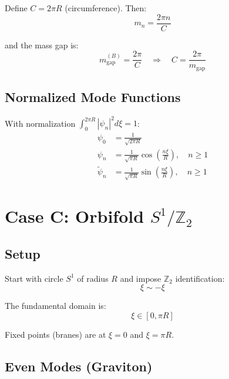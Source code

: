 \documentclass[11pt,a4paper]{article}
\newcommand{\mgap}{m_{\mathrm{gap}}}
\begin{document}
Define $C = 2\pi R$ (circumference). Then:
\begin{equation}
m_n = \frac{2\pi n}{C}
\label{eq:spectrum-B-circ}
\end{equation}

and the mass gap is:
\begin{equation}
\mgap^{(B)} = \frac{2\pi}{C} \quad \Rightarrow \quad C = \frac{2\pi}{\mgap}
\label{eq:C-from-mgap}
\end{equation}

\subsection{Normalized Mode Functions}

With normalization $\int_0^{2\pi R} |\psi_n|^2 d\xi = 1$:
\begin{align}
\psi_0 &= \frac{1}{\sqrt{2\pi R}} \label{eq:caseB-psi0}\\
\psi_n &= \frac{1}{\sqrt{\pi R}} \cos\left(\frac{n\xi}{R}\right), \quad n \geq 1
\label{eq:caseB-psin-cos}\\
\tilde{\psi}_n &= \frac{1}{\sqrt{\pi R}} \sin\left(\frac{n\xi}{R}\right), \quad n \geq 1
\label{eq:caseB-psin-sin}
\end{align}

\section{Case C: Orbifold $S^1/\mathbb{Z}_2$}

\subsection{Setup}

Start with circle $S^1$ of radius $R$ and impose $\mathbb{Z}_2$ identification:
\begin{equation}
\xi \sim -\xi
\label{eq:caseC-Z2}
\end{equation}

The fundamental domain is:
\begin{equation}
\xi \in [0, \pi R]
\label{eq:caseC-domain}
\end{equation}

Fixed points (branes) are at $\xi = 0$ and $\xi = \pi R$.

\subsection{Even Modes (Graviton)}
\end{document}
